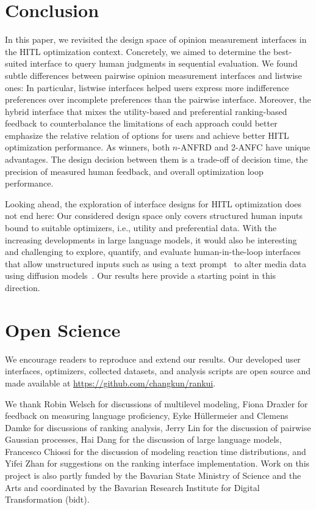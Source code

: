 \documentclass[acmsmall,screen,nonacm]{acmart}
\begin{document}
\section{Conclusion}
In this paper, we revisited the design space of opinion measurement interfaces in the HITL optimization context. Concretely, we aimed to determine the best-suited interface to query human judgments in sequential evaluation.
%
We found subtle differences between pairwise opinion measurement interfaces and listwise ones: In particular, listwise interfaces helped users express more indifference preferences over incomplete preferences than the pairwise interface. Moreover, the hybrid interface that mixes the utility-based and preferential ranking-based feedback to counterbalance the limitations of each approach could better emphasize the relative relation of options for users and achieve better HITL optimization performance. As winners, both $n$-ANFRD and 2-ANFC have unique advantages. The design decision between them is a trade-off of decision time, the precision of measured human feedback, and overall optimization loop performance.

Looking ahead, the exploration of interface designs for HITL optimization does not end here: Our considered design space only covers structured human inputs bound to suitable optimizers, i.e., utility and preferential data.
%
With the increasing developments in large language models, it would also be interesting and challenging to explore, quantify, and evaluate human-in-the-loop interfaces that allow unstructured inputs such as using a text prompt~\cite{dang2022prompt} to alter media data using diffusion models~\cite{rombach2022stablediffusion}. Our results here provide a starting point in this direction.

\section*{Open Science}
\label{sec:open-science}
We encourage readers to reproduce and extend our results. Our developed user interfaces, optimizers, collected datasets, and analysis scripts are open source and made available at \url{https://github.com/changkun/rankui}.

\begin{acks}
We thank
Robin Welsch for discussions of multilevel modeling,
Fiona Draxler for feedback on measuring language proficiency,
Eyke Hüllermeier and Clemens Damke for discussions of ranking analysis,
Jerry Lin for the discussion of pairwise Gaussian processes,
Hai Dang for the discussion of large language models,
Francesco Chiossi for the discussion of modeling reaction time distributions,
and Yifei Zhan for suggestions on the ranking interface implementation.
Work on this project is also partly funded by the Bavarian State Ministry of Science and the Arts and coordinated by the Bavarian Research Institute for Digital Transformation (bidt).
\end{acks}
\end{document}
